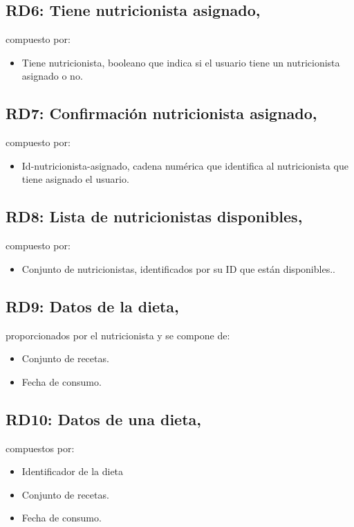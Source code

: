 \documentclass[12pt,letterpaper]{article}
\begin{document}
\subsection{RD6: Tiene nutricionista asignado,} compuesto por:
\begin{itemize}
\item Tiene nutricionista, booleano que indica si el usuario tiene un nutricionista asignado o no.

\end{itemize} 
\subsection{RD7: Confirmación nutricionista asignado,} compuesto por:
\begin{itemize}
\item Id-nutricionista-asignado, cadena numérica que identifica al nutricionista que tiene asignado el usuario.

\end{itemize} 
\subsection{RD8: Lista de nutricionistas disponibles,} compuesto por:
\begin{itemize}
\item Conjunto de nutricionistas, identificados por su ID que están disponibles..

\end{itemize} 
\subsection{RD9: Datos de la dieta,} proporcionados por el nutricionista y se compone de:
\begin{itemize}
\item Conjunto de recetas.
\item Fecha de consumo.

\end{itemize} 
\subsection{RD10: Datos de una dieta,} compuestos por:
\begin{itemize}
\item Identificador de la dieta
\item Conjunto de recetas.
\item Fecha de consumo.

\end{itemize} 
\end{document}
